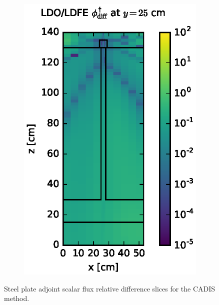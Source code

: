 \begin{figure}[!htb]
\begin{subfigure}{0.4\textwidth}
\includegraphics[max height=0.445\textheight]
{img/steel-plots/cad-adj/flux-diff-rel-ldfe01.eps}
\end{subfigure}
\caption{Steel plate adjoint scalar flux relative difference slices for the CADIS 
         method.}
\label{steel-cad-adj-diff-rel}
\end{figure}

